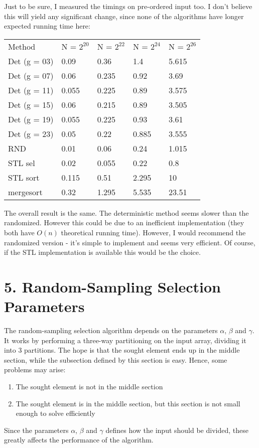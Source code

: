 \documentclass[10pt,oneside,a4paper,final,english]{memoir}
\begin{document}
Just to be sure, I measured the timings on pre-ordered input too. I
don't believe this will yield any significant change, since none of
the algorithms have longer expected running time here:\\
\begin{tabular}{lllll}
Method & N = $2^{20}$ & N = $2^{22}$ & N = $2^{24}$ & N = $2^{26}$ \\
    Det (g = 03) &  0.09 &  0.36 &  1.4 &  5.615 \\
    Det (g = 07) & 0.06 & 0.235 & 0.92 & 3.69 \\
    Det (g = 11) & 0.055 & 0.225 & 0.89 & 3.575 \\
    Det (g = 15) & 0.06 & 0.215 & 0.89 & 3.505 \\
    Det (g = 19) & 0.055 & 0.225 & 0.93 & 3.61 \\
    Det (g = 23) & 0.05 & 0.22 & 0.885 & 3.555 \\
             RND &  0.01 &  0.06 &  0.24 &  1.015 \\
         STL sel & 0.02 & 0.055 & 0.22 &  0.8 \\
        STL sort & 0.115 & 0.51 & 2.295 &   10 \\
       mergesort & 0.32 & 1.295 & 5.535 & 23.51
\end{tabular}

The overall result is the same. The deterministic method seems slower
than the randomized. However this could be due to an inefficient
implementation (they both have $O(n)$ theoretical running
time). However, I would recommend the randomized version - it's simple
to implement and seems very efficient. Of course, if the STL
implementation is available this would be the choice.

\section*{5. Random-Sampling Selection Parameters}
The random-sampling selection algorithm depends on the parameters
$\alpha$, $\beta$ and $\gamma$. It works by performing a three-way
partitioning on the input array, dividing it into 3 partitions. The
hope is that the sought element ends up in the middle section, while
the subsection defined by this section is easy. Hence, some problems
may arise:
\begin{enumerate}
\item The sought element is not in the middle section
\item The sought element is in the middle section, but this section is
  not small enough to solve efficiently
\end{enumerate}

Since the parameters $\alpha$, $\beta$ and $\gamma$ defines how the
input should be divided, these greatly affects the performance of the
algorithm.
\end{document}
